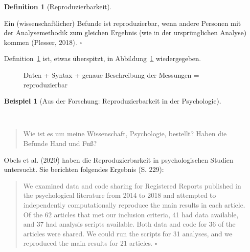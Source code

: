 \documentclass[
  letterpaper,
  oneside,
  open=any]{scrbook}
\theoremstyle{definition}
\theoremstyle{definition}
\newtheorem{example}{Beispiel}[chapter]
\theoremstyle{definition}
\newtheorem{definition}{Definition}[chapter]
\theoremstyle{remark}
\begin{document}
\begin{definition}[Reproduzierbarkeit]\protect\hypertarget{def-repro}{}\label{def-repro}

Ein (wissenschaftlicher) Befunde ist reproduzierbar, wenn andere
Personen mit der Analysemethodik zum gleichen Ergebnis (wie in der
ursprünglichen Analyse) kommen (Plesser, 2018). \(\square\)

\end{definition}

Definition~\ref{def-repro} ist, etwas überspitzt, in
Abbildung~\ref{fig-repro} wiedergegeben.

\begin{figure}


\caption{\label{fig-repro}Daten + Syntax + genaue Beschreibung der
Messungen = reproduzierbar}

\end{figure}%

\begin{example}[Aus der Forschung: Reproduzierbarkeit in der
Psychologie]\protect\hypertarget{exm-repro}{}\label{exm-repro}

~

\begin{quote}
{} Wie ist es um meine Wissenschaft, Psychologie,
bestellt? Haben die Befunde Hand und Fuß?
\end{quote}

Obels et al. (2020) haben die Reproduzierbarkeit in psychologischen
Studien untersucht. Sie berichten folgendes Ergebnis (S. 229):

\begin{quote}
We examined data and code sharing for Registered Reports published in
the psychological literature from 2014 to 2018 and attempted to
independently computationally reproduce the main results in each
article. Of the 62 articles that met our inclusion criteria, 41 had data
available, and 37 had analysis scripts available. Both data and code for
36 of the articles were shared. We could run the scripts for 31
analyses, and we reproduced the main results for 21 articles.
\(\square\)
\end{quote}

\end{example}
\end{document}
